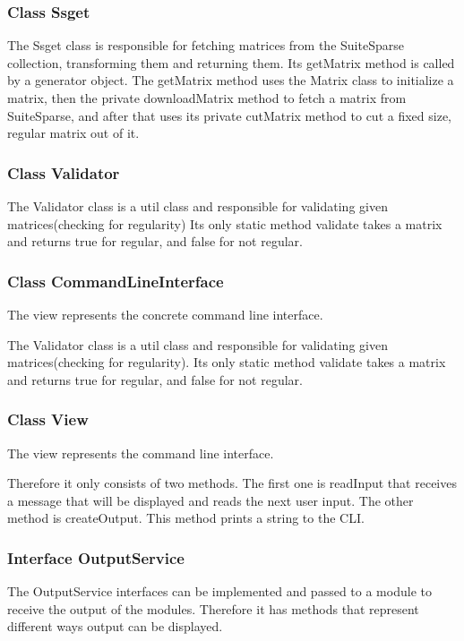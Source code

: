 \documentclass[parskip=full]{scrartcl}
\begin{document}
\subsubsection{Class Ssget}
The Ssget class is responsible for fetching matrices from the SuiteSparse collection, transforming them and returning them.
Its getMatrix method is called by a generator object.
The getMatrix method uses the Matrix class to initialize a matrix, then the private downloadMatrix method to fetch a matrix from SuiteSparse, and after that uses its private cutMatrix method to cut a fixed size, regular matrix out of it.

\subsubsection{Class Validator}

The Validator class is a util class and responsible for validating given matrices(checking for regularity)
 Its only static method validate takes a matrix and returns true for regular, and false for not regular.

\subsubsection{Class CommandLineInterface}
The view represents the concrete command line interface. 

The Validator class is a util class and responsible for validating given matrices(checking for regularity).
Its only static method validate takes a matrix and returns true for regular, and false for not regular.

\subsubsection{Class View}
The view represents the command line interface. 

Therefore it only consists of two methods. 
The first one is readInput that receives a message that will be displayed and reads the next user input. 
The other method is createOutput. 
This method prints a string to the CLI.


\subsubsection{Interface OutputService}
The OutputService interfaces can be implemented and passed to a module to receive the output of the modules. 
Therefore it has methods that represent different ways output can be displayed. 
\end{document}
